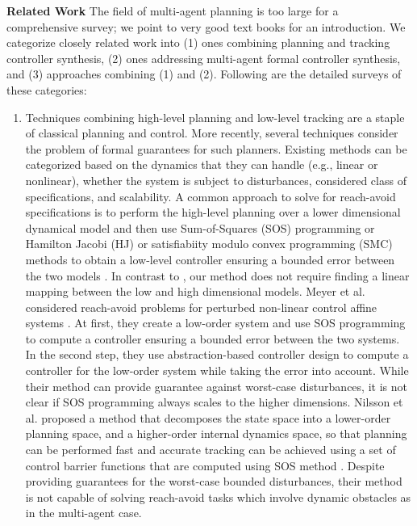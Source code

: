 \smallskip
\noindent\textbf{Related Work}
%
The field of multi-agent planning is too large for a comprehensive survey; we point to very good text books
\cite{LaValle2006,LaValle1998planning,choset2005principles,russel2010AIplanning} for an introduction.
We categorize closely related work into (1) ones combining planning and tracking controller synthesis, 
(2) ones addressing multi-agent formal controller synthesis, and 
(3) approaches combining (1) and (2).
Following are the detailed surveys of these categories:

\begin{enumerate}[(1)]
	\item Techniques combining high-level planning and low-level tracking are a staple of classical planning and control. 
More recently, several techniques consider the problem of formal guarantees for such planners.
Existing methods can be categorized based on the dynamics that they can handle (e.g., linear or nonlinear),
whether the system is subject to disturbances, considered class of specifications, and scalability. 
A common approach to solve for reach-avoid specifications is to perform the high-level planning over a lower dimensional dynamical model and then use
Sum-of-Squares (SOS) programming or Hamilton Jacobi (HJ) or satisfiabiity modulo convex programming (SMC) methods to obtain a low-level controller ensuring a bounded error between the 
two models \cite{herbert2017fastrack,DBLP:journals/corr/abs-1911-09773,singh2018robust,Nilsson:2018}. 
In contrast to \cite{herbert2017fastrack,singh2018robust}, our method does not require finding 
a linear mapping between the low and high dimensional models. Meyer et al. considered reach-avoid problems for perturbed non-linear control affine systems \cite{DBLP:journals/corr/abs-1911-09773}. At first, they create a low-order system and use SOS programming to compute a controller ensuring a bounded error between the two systems. In the second step, they use abstraction-based controller design to compute a controller for the low-order system while taking the error into account. While their method can provide guarantee against worst-case disturbances, it is not clear if SOS programming always scales to the higher dimensions. 
Nilsson et al.  proposed a method that decomposes the state space into a lower-order planning space, and a higher-order internal dynamics space, so that planning can be performed fast and accurate tracking can be achieved using a set of control barrier functions that are computed using SOS method \cite{Nilsson:2018}. Despite providing guarantees for the worst-case bounded disturbances, their method is not capable of solving reach-avoid tasks which involve dynamic obstacles as in the multi-agent case.

\end{enumerate}

